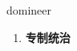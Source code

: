
\begin{frame}
{\huge domineer}
\begin{center}
\begin{enumerate}\Large
  \item \textbf{专制统治}
\end{enumerate}
\end{center}
\end{frame}
